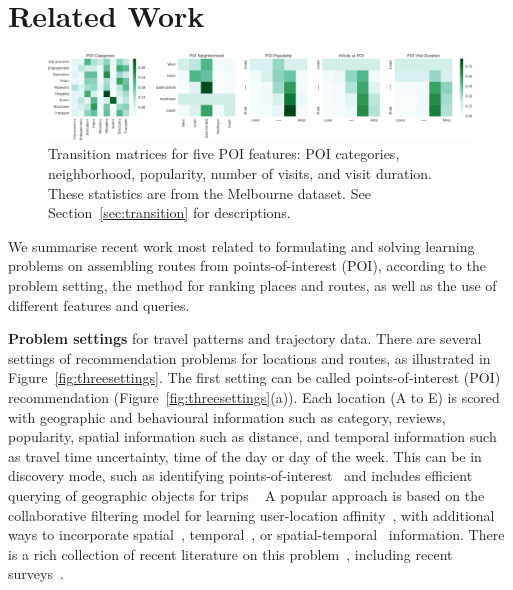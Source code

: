 
\section{Related Work}
\label{sec:relatedwork}


\begin{figure}[htbp]
\includegraphics[width=\textwidth]{fig/poi_transmat.png}
\caption{Transition matrices for five POI features: POI categories, neighborhood, popularity, number of visits, and visit duration. These statistics are from the Melbourne dataset. See Section~\ref{sec:transition} for descriptions.}
\label{fig:transmat}
\end{figure}



We summarise recent work most related to formulating and solving learning problems on assembling routes
from points-of-interest (POI), according to the problem setting, the method for ranking places and routes, as well as the use of different features and queries.

{\bf Problem settings} for travel patterns and trajectory data.
There are several settings of recommendation problems for locations and routes, as illustrated in Figure~\ref{fig:threesettings}.
The first setting can be called points-of-interest (POI) recommendation (Figure~\ref{fig:threesettings}(a)). Each location (A to E) is scored with geographic and behavioural information such as category, reviews, popularity, spatial information such as distance, and temporal information such as travel time uncertainty, time of the day or day of the week.
This can be in discovery mode, such as identifying points-of-interest~\cite{zheng2009mining,li2015instagram} and includes efficient querying of geographic objects for trips ~\cite{hashem2015efficient}
A popular approach is based on the collaborative filtering model
for learning user-location affinity~\cite{shi2011personalized}, with additional ways to incorporate spatial~\cite{lian2014geomf,liu2014exploiting}, temporal~\cite{yuan2013timeaware,hsieh2014mining,gao2013temporal}, or spatial-temporal~\cite{yuan2014graph} information.
There is a rich collection of recent literature on this problem~\cite{yin2015joint,shi2011personalized,lian2014geomf,liu2014exploiting,yuan2013timeaware,hsieh2014mining,gao2013temporal,yuan2014graph}, including recent surveys~\cite{bao2015recommendations,zheng2014urban}.


